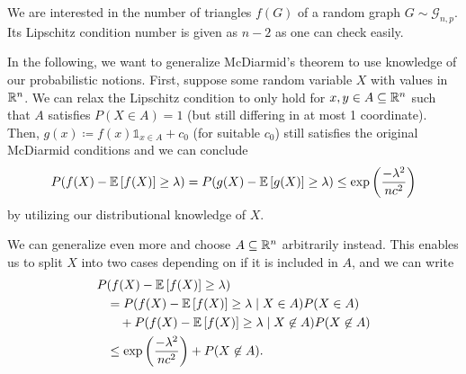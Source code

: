 We are interested in the number of triangles $f(G)$ of a random graph $G \sim \mathcal{G}_{n,p}$.
Its Lipschitz condition number is given as $n-2$ as one can check easily.

In the following, we want to generalize McDiarmid's theorem to use knowledge of our probabilistic notions.
First, suppose some random variable $X$ with values in $\mathbb{R}^n$.
We can relax the Lipschitz condition to only hold for $x,y \in A \subseteq \mathbb{R}^n$
such that $A$ satisfies $P(X \in A) = 1$ (but still differing in at most 1 coordinate).
Then, $g(x) \coloneqq f(x) \mathbb{1}_{x \in A} + c_0$ (for suitable $c_0$) still satisfies the original McDiarmid conditions
and we can conclude
\begin{align}
    P(f(X) - \mathbb{E}\left[f(X)\right] \geq \lambda) = P(g(X) - \mathbb{E}\left[g(X)\right] \geq \lambda) \leq \exp\left(\frac{-\lambda^2}{nc^2}\right)
\end{align}
by utilizing our distributional knowledge of $X$.

We can generalize even more and choose $A \subseteq \mathbb{R}^n$ arbitrarily instead.
This enables us to split $X$ into two cases depending on if it is included in $A$, and we can write
\begin{equation} \label{eq:upper_bound_split_diarmid}
    \begin{split}
        P & (f(X) - \mathbb{E}\left[f(X)\right] \geq \lambda)                                           \\
        & = P(f(X) - \mathbb{E}\left[f(X)\right] \geq \lambda \mid X \in A ) P(X \in A)               \\
        & \quad + P(f(X) - \mathbb{E}\left[f(X)\right] \geq \lambda  \mid X \not\in A) P(X \not\in A) \\
        & \leq \exp\left(\frac{-\lambda^2}{nc^2}\right) + P(X \not \in A).
    \end{split}
\end{equation}

